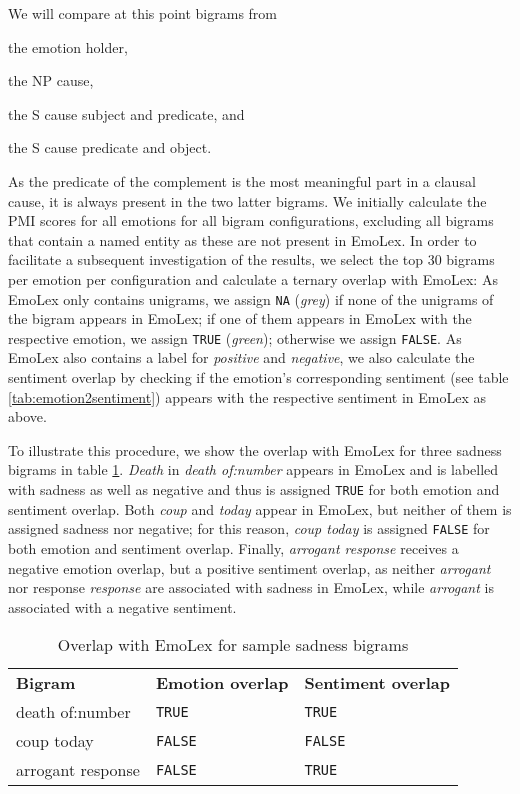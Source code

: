 \begin{inparaenum} We will compare at this point bigrams from \item the emotion holder, \item the NP cause, \item the S cause subject and predicate, and \item the S cause predicate and object.\end{inparaenum} As the predicate of the complement is the most meaningful part in a clausal cause, it is always present in the two latter bigrams. We initially calculate the PMI scores for all emotions for all bigram configurations, excluding all bigrams that contain a named entity as these are not present in EmoLex. In order to facilitate a subsequent investigation of the results, we select the top 30 bigrams per emotion per configuration and calculate a ternary overlap with EmoLex: As EmoLex only contains unigrams, we assign \texttt{NA} (\textit{grey}) if none of the unigrams of the bigram appears in EmoLex; if one of them appears in EmoLex with the respective emotion, we assign \texttt{TRUE} (\textit{green}); otherwise we assign \texttt{FALSE}. As EmoLex also contains a label for \textit{positive} and \textit{negative}, we also calculate the sentiment overlap by checking if the emotion's corresponding sentiment (see table \ref{tab:emotion2sentiment}) appears with the respective sentiment in EmoLex as above.

To illustrate this procedure, we show the overlap with EmoLex for three sadness bigrams in table \ref{tab:emolex-overlap-example}. \textit{Death} in \textit{death of:number} appears in EmoLex and is labelled with sadness as well as negative and thus is assigned \texttt{TRUE} for both emotion and sentiment overlap. Both \textit{coup} and \textit{today} appear in EmoLex, but neither of them is assigned sadness nor negative; for this reason, \textit{coup today} is assigned \texttt{FALSE} for both emotion and sentiment overlap. Finally, \textit{arrogant response} receives a negative emotion overlap, but a positive sentiment overlap, as neither \textit{arrogant} nor response \textit{response} are associated with sadness in EmoLex, while \textit{arrogant} is associated with a negative sentiment.

\begin{table}[]
\centering
\begin{tabular}{l|l|l}
{\bf Bigram} & {\bf Emotion overlap} & {\bf Sentiment overlap} \\
death of:number & \texttt{TRUE} & \texttt{TRUE} \\
coup today & \texttt{FALSE} & \texttt{FALSE} \\
arrogant response & \texttt{FALSE} & \texttt{TRUE}
\end{tabular}
\caption{Overlap with EmoLex for sample sadness bigrams}
\label{tab:emolex-overlap-example}
\end{table}

